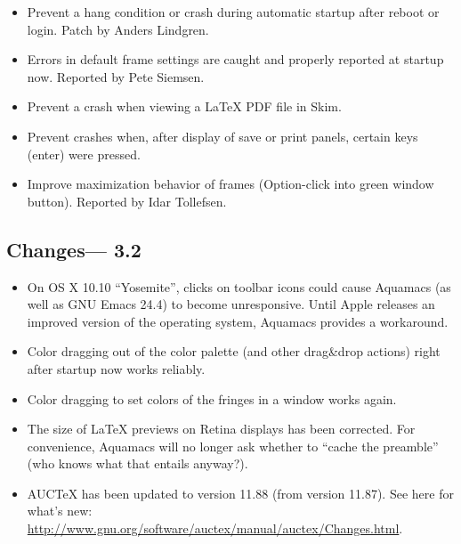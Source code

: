 \begin{itemize}
\item Prevent a hang condition or crash during automatic startup after reboot or login.
Patch by Anders Lindgren.
\item Errors in default frame settings are caught and properly reported at startup now.
Reported by Pete Siemsen.
\item Prevent a crash when viewing a LaTeX PDF file in Skim.
\item Prevent crashes when, after display of save or print panels, certain keys (enter) were pressed.
\item Improve maximization behavior of frames (Option-click into green window button).
Reported by Idar Tollefsen.

\end{itemize}
\subsection{Changes--- 3.2}
\begin{itemize}
\item On OS X 10.10 ``Yosemite'', clicks on toolbar icons could cause Aquamacs (as well as GNU Emacs 24.4) to become unresponsive.  Until Apple releases an improved version of the operating system, Aquamacs provides a workaround.
\item Color dragging out of the color palette (and other drag\&drop actions) right after startup now works reliably.
\item Color dragging to set colors of the fringes in a window works again.
\item The size of LaTeX previews on Retina displays has been corrected.  For convenience, Aquamacs will no longer ask whether to ``cache the preamble'' (who knows what that entails anyway?).
\item AUCTeX has been updated to version 11.88 (from version 11.87). See here for what's new: \url{http://www.gnu.org/software/auctex/manual/auctex/Changes.html}.
\end{itemize}
